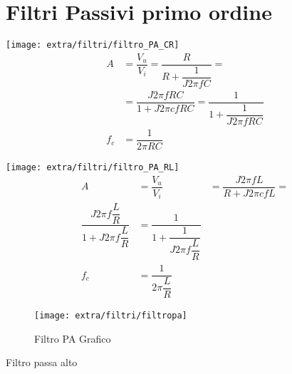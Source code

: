 \chapter{Filtri Passivi primo ordine}
\label{cha:Filtripassiviprimoord}
\begin{table}[t]
\centering
     \begin{minipage}{0.4\textwidth}
      \centering
       \texttt{[image: extra/filtri/filtro\_PA\_CR]}
\centering
 \begin{align*}
A&=\dfrac{V_{u}}{V_{i}}
=\dfrac{R}{R+\dfrac{1}{J2\pi fC}}=\\
&=\dfrac{J2\pi fRC}{1+J2\pi cfRC}=
\dfrac{1}{1+\dfrac{1}{J2\pi fRC}}\\
f_{c}&=\dfrac{1}{2\pi RC}
        \end{align*}
       \end{minipage}\hfill
\begin{minipage}[t]{0.4\textwidth}
      \centering
\texttt{[image: extra/filtri/filtro\_PA\_RL]}
\centering
     \begin{align*}
A&=\dfrac{V_{u}}{V_{i}}&=\dfrac{J2\pi fL}{R+J2\pi cfL}=\\
\dfrac{J2\pi f\dfrac{L}{R}}{1+J2\pi f\dfrac{L}{R}}
&=\dfrac{1}{1+\dfrac{1}{J2\pi f\dfrac{L}{R}}}\\
f_{c}&=\dfrac{1}{2\pi \dfrac{L}{R}}
        \end{align*}
     \end{minipage}
 \begin{subfigure}[b]{.5\linewidth}
 	\centering\texttt{[image: extra/filtri/filtropa]}
 	\caption{Filtro PA Grafico}
 \end{subfigure}
\caption{Filtro passa alto}
\label{tab:filtropassaalto}
\end{table}
